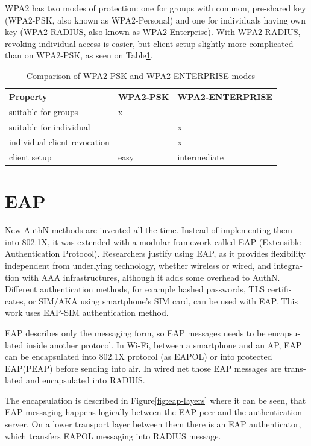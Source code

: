 \documentclass[12pt,a4paper,english]{tutthesis}
\begin{document}
\begin{otherlanguage}{english}
WPA2 has two modes of protection: one for groups with common, pre-shared
key (WPA2-PSK, also known as WPA2-Personal) and one for individuals
having own key (WPA2-RADIUS, also known as  WPA2-Enterprise).  With WPA2-RADIUS, revoking
individual access is easier, but client setup slightly more
complicated than on WPA2-PSK, as seen on Table\ref{psk-enterprise}.

\begin{table}[htb]
\caption{\label{psk-enterprise}Comparison of WPA2-PSK and WPA2-ENTERPRISE modes}
\centering
\begin{tabular}{l|l|l}
Property & WPA2-PSK & WPA2-ENTERPRISE\\
\hline
suitable for groups & x & \\
suitable for individual &  & x\\
individual client revocation &  & x\\
client setup & easy & intermediate\\
\hline
\end{tabular}
\end{table}


\section{EAP}
\label{sec-2-4}

New AuthN methods are invented all the time.
Instead of implementing them into 802.1X, it was 
extended with a modular framework called 
 EAP (Extensible Authentication Protocol)\cite{rfc5247}. 
Researchers justify using EAP, as it
provides flexibility independent from underlying technology, whether
wireless or wired,  and integration with AAA infrastructures, although
it adds some overhead to AuthN\cite{pereniguez10}.
Different authentication methods, for example hashed passwords, TLS
 certificates, or SIM/AKA using smartphone's SIM card,  can
be used with EAP.
This work uses EAP-SIM authentication method.


EAP describes only the messaging form, so EAP messages needs to
be encapsulated inside another protocol.  In Wi-Fi, between a smartphone
and an AP, EAP can be encapsulated into 802.1X protocol (as EAPOL) or
into protected EAP(PEAP)\cite{peap} before sending
into air. In wired net those EAP messages are translated and encapsulated into RADIUS.

The encapsulation is described in Figure\ref{fig:eap-layers} where it can be
seen, that EAP messaging happens logically between the EAP peer and
the authentication server. On a lower transport layer between them
there is an EAP authenticator, which transfers EAPOL messaging into
RADIUS message.


\end{otherlanguage}
\end{document}
